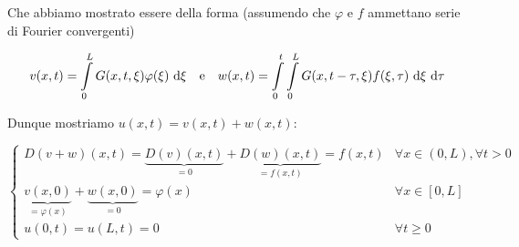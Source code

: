 \documentclass{article}
\begin{document}
Che abbiamo mostrato essere della forma (assumendo che $\varphi$ e $f$ ammettano serie di Fourier convergenti)

\[v(x,t) = \intop_0^L G(x, t, \xi)\varphi(\xi)\de\xi\quad\text{e} \quad w(x,t) = \intop_0^t\intop_0^L G(x,t-\tau,\xi) f(\xi,\tau)\de\xi\de\tau  \]  

Dunque mostriamo $u(x,t) = v(x,t)+w(x,t)$:

\[ \begin{cases} D(v+w)(x,t) = \underbrace{D(v)(x,t)}_{=0} + \underbrace{D(w)(x,t)}_{=f(x,t)} = f(x,t) & \forall x \in (0,L), \forall t > 0 \\ \underbrace{v(x,0)}_{= \varphi(x)} + \underbrace{w(x,0)}_{=0}  = \varphi(x) & \forall x \in [0,L] \\ u(0,t) = u(L,t) = 0 & \forall t \ge 0 \end{cases}\]
\end{document}
